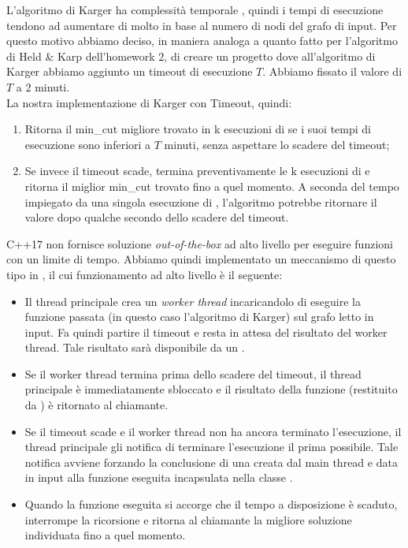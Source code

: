 \noindent L'algoritmo di Karger ha complessità temporale \complexityKargerTime{}, quindi i tempi di esecuzione tendono ad aumentare di molto in base al numero di nodi del grafo di input. Per questo motivo abbiamo deciso, in maniera analoga a quanto fatto per l'algoritmo di Held \& Karp dell'homework 2, di creare un progetto dove all'algoritmo di Karger abbiamo aggiunto un timeout di esecuzione $T$. Abbiamo fissato il valore di $T$ a 2 minuti.\\

\noindent La nostra implementazione di Karger con Timeout, quindi:

\begin{enumerate}
    \item Ritorna il min\_cut migliore trovato in k esecuzioni di  se i suoi tempi di esecuzione sono inferiori a $T$ minuti, senza aspettare lo scadere del timeout;
    \item Se invece il timeout scade, termina preventivamente le k esecuzioni di  e ritorna il miglior min\_cut trovato fino a quel momento. A seconda del tempo impiegato da una singola esecuzione di , l'algoritmo potrebbe ritornare il valore dopo qualche secondo dello scadere del timeout.
\end{enumerate}

\noindent C++17 non fornisce soluzione \textit{out-of-the-box} ad alto livello per eseguire funzioni con un limite di tempo. Abbiamo quindi implementato un meccanismo di questo tipo in , il cui funzionamento ad alto livello è il seguente:

\begin{itemize}
    \item Il thread principale crea un \textit{worker thread} incaricandolo di eseguire la funzione passata (in questo caso l'algoritmo di Karger) sul grafo letto in input. Fa quindi partire il timeout e resta in attesa del risultato del worker thread. Tale risultato sarà disponibile da un .
    \item Se il worker thread termina prima dello scadere del timeout, il thread principale è immediatamente sbloccato e il risultato della funzione (restituito da ) è ritornato al chiamante.
    \item Se il timeout scade e il worker thread non ha ancora terminato l'esecuzione, il thread principale gli notifica di terminare l'esecuzione il prima possibile. Tale notifica avviene forzando la conclusione di una  creata dal main thread e data in input alla funzione eseguita incapsulata nella classe .
    \item Quando la funzione eseguita si accorge che il tempo a disposizione è scaduto, interrompe la ricorsione e ritorna al chiamante la migliore soluzione individuata fino a quel momento.
\end{itemize}